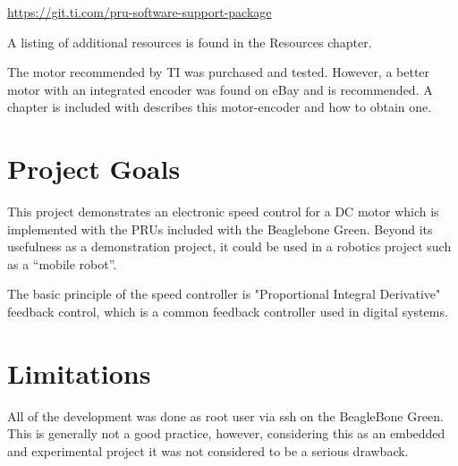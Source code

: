 \url{https://git.ti.com/pru-software-support-package}

A listing of additional resources is found in the Resources chapter.

The motor recommended by TI was purchased and tested.  However, a better motor with an integrated encoder was found on eBay and is recommended.  A chapter is included with describes this motor-encoder and how to obtain one.

\section{Project Goals}

This project demonstrates an electronic speed control for a DC motor which is implemented with the PRUs included with the Beaglebone Green.  Beyond its usefulness as a demonstration project, it could be used in a robotics project such as a ``mobile robot''.

The basic principle of the speed controller is "Proportional Integral Derivative" feedback control, which is a common feedback controller used in digital systems.

\section{Limitations}

All of the development was done as root user via ssh on the BeagleBone Green.  This is generally not a good practice, however, considering this as an embedded and experimental project it was not considered to be a serious drawback.


